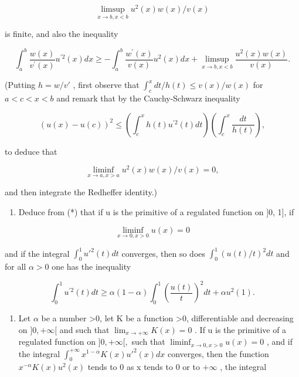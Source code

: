 \[
\limsup _ {x \to b, x <   b} u ^ {2} (x) w (x) / v (x)
\]

is finite, and also the inequality

\[
\int_ {a} ^ {b} \frac {w (x)}{v ^ {\prime} (x)} u ^ {\prime 2} (x) d x \geqslant - \int_ {a} ^ {b} \frac {w ^ {\prime} (x)}{v (x)} u ^ {2} (x) d x + \operatorname * {l i m s u p} _ {x \to b, x <   b} \frac {u ^ {2} (x) w (x)}{v (x)}.\tag{*}
\]

(Putting \(h = w / v'\) , first observe that \(\int_{c}^{x} dt / h(t) \leqslant v(x) / w(x)\) for \(a < c < x < b\) and remark that by the Cauchy-Schwarz inequality

\[
(u (x) - u (c)) ^ {2} \leqslant \left(\int_ {c} ^ {x} h (t) u ^ {\prime 2} (t) d t\right) \left(\int_ {c} ^ {x} \frac {d t}{h (t)}\right),\tag{**}
\]

to deduce that

\[
\liminf _ {x \to a, x > a} u ^ {2} (x) w (x) / v (x) = 0,
\]

and then integrate the Redheffer identity.)

\begin{enumerate}
\def\labelenumi{\alph{enumi})}
\setcounter{enumi}{2}
\tightlist
\item
  Deduce from (*) that if u is the primitive of a regulated function on {]}0, 1{]}, if
\end{enumerate}

\[
\liminf _ {x \to 0, x > 0} u (x) = 0
\]

and if the integral \(\int_0^1 u'^2 (t)dt\) converges, then so does \(\int_0^1 (u(t) / t)^2 dt\) and for all \(\alpha > 0\) one has the inequality

\[
\int_ {0} ^ {1} u ^ {\prime 2} (t) d t \geqslant \alpha (1 - \alpha) \int_ {0} ^ {1} \left(\frac {u (t)}{t}\right) ^ {2} d t + \alpha u ^ {2} (1).
\]

\begin{enumerate}
\def\labelenumi{\alph{enumi})}
\setcounter{enumi}{3}
\tightlist
\item
  Let \(\alpha\) be a number \textgreater0, let K be a function \textgreater0, differentiable and decreasing on \(]0, +\infty[\) and such that \(\lim_{x \to +\infty} K(x) = 0\) . If u is the primitive of a regulated function on \(]0, +\infty[,\) such that \(\liminf_{x \to 0, x > 0} u(x) = 0\) , and if the integral \(\int_{0}^{+\infty} x^{1-\alpha} K(x) u'^{2}(x) dx\) converges, then the function \(x^{-\alpha} K(x) u^{2}(x)\) tends to 0 as x tends to 0 or to \(+\infty\) , the integral
\end{enumerate}


